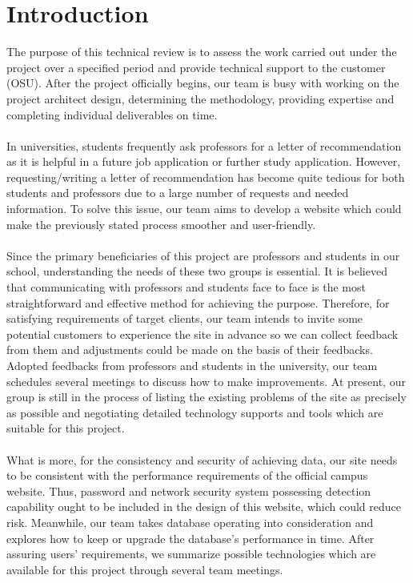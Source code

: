 \documentclass[onecolumn, draftclsnofoot,10pt, compsoc]{IEEEtran}
\begin{document}
\section{Introduction}
The purpose of this technical review is to assess the work carried out under the project over a specified period and provide technical support to the customer (OSU). After the project officially begins, our team is busy with working on the project architect design, determining the methodology, providing expertise and completing individual deliverables on time. \\
\\
	\indent In universities, students frequently ask professors for a letter of recommendation as it is helpful in a future job application or further study application. However, requesting/writing a letter of recommendation has become quite tedious for both students and professors due to a large number of requests and needed information. To solve this issue, our team aims to develop a website which could make the previously stated process smoother and user-friendly. \\
	\\
	\indent Since the primary beneficiaries of this project are professors and students in our school, understanding the needs of these two groups is essential. It is believed that communicating with professors and students face to face is the most straightforward and effective method for achieving the purpose. Therefore, for satisfying requirements of target clients, our team intends to invite some potential customers to experience the site in advance so we can collect feedback from them and adjustments could be made on the basis of their feedbacks. Adopted feedbacks from professors and students in the university, our team schedules several meetings to discuss how to make improvements. At present, our group is still in the process of listing the existing problems of the site as precisely as possible and negotiating detailed technology supports and tools which are suitable for this project. \\
	\\
	\indent What is more, for the consistency and security of achieving data, our site needs to be consistent with the performance requirements of the official campus website. Thus, password and network security system possessing detection capability ought to be included in the design of this website, which could reduce risk. Meanwhile, our team takes database operating into consideration and explores how to keep or upgrade the database's performance in time. After assuring users’ requirements, we summarize possible technologies which are available for this project through several team meetings. 
\end{document}
